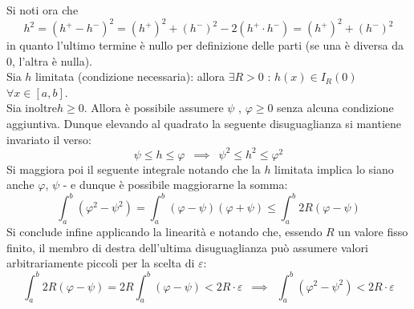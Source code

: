 \documentclass[10pt]{article}
\theoremstyle{plain}
\begin{document}
Si noti ora che 
\[h^2 = (h^+ - h^-)^2 = (h^+)^2 + (h^-)^2 - 2 (h^+ \cdot h^-) = (h^+)^2 + (h^-)^2\]
in quanto l'ultimo termine è nullo per definizione delle parti (se una è diversa da $0$, l'altra è nulla).
\\Sia $h$ limitata (condizione necessaria): allora $\exists R > 0$ : $h(x) \in I_R(0)$ $\forall x \in [a,b]$.
\\Sia inoltre$h \geq 0$. Allora è possibile assumere $\psi$ , $\varphi \geq 0$ senza alcuna condizione aggiuntiva. Dunque elevando al quadrato la seguente disuguaglianza si mantiene invariato il verso:
\[\psi \leq h \leq \varphi \enspace \implies \enspace \psi^2 \leq h^2 \leq \varphi^2\]
Si maggiora poi il seguente integrale notando che la $h$ limitata implica lo siano anche $\varphi$, $\psi$ - e dunque è possibile maggiorarne la somma:
\[\int_a^b (\varphi^2 - \psi^2) = \int_a^b(\varphi - \psi) (\varphi + \psi) \leq \int_a^b 2R (\varphi - \psi)\]
Si conclude infine applicando la linearità e notando che, essendo $R$ un valore fisso finito, il membro di destra dell'ultima disuguaglianza può assumere valori arbitrariamente piccoli per la scelta di $\varepsilon$:
\[\int_a^b 2R (\varphi - \psi) = 2R \int_a^b (\varphi - \psi) < 2R \cdot \varepsilon \enspace \implies \enspace \int_a^b (\varphi^2 - \psi^2) < 2R \cdot \varepsilon\]
\end{document}
